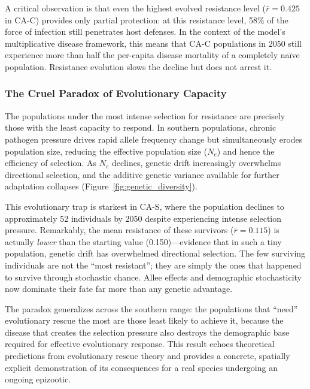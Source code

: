 \noindent
A critical observation is that even the highest evolved resistance
level ($\bar{r} = 0.425$ in CA-C) provides only partial protection:
at this resistance level, 58\% of the force of infection still
penetrates host defenses.  In the context of the model's multiplicative
disease framework, this means that CA-C populations in 2050 still
experience more than half the per-capita disease mortality of a
completely na\"ive population.  Resistance evolution slows the decline
but does not arrest it.

\subsubsection{The Cruel Paradox of Evolutionary Capacity}

The populations under the most intense selection for resistance are
precisely those with the least capacity to respond.  In southern
populations, chronic pathogen pressure drives rapid allele frequency
change but simultaneously erodes population size, reducing the
effective population size ($N_e$) and hence the efficiency of
selection.  As $N_e$ declines, genetic drift increasingly overwhelms
directional selection, and the additive genetic variance available for
further adaptation collapses
(Figure~\ref{fig:genetic_diversity}).

This evolutionary trap is starkest in CA-S, where the population
declines to approximately 52 individuals by 2050 despite experiencing
intense selection pressure.  Remarkably, the mean resistance of these
survivors ($\bar{r} = 0.115$) is actually \textit{lower} than the
starting value (0.150)---evidence that in such a tiny population,
genetic drift has overwhelmed directional selection.  The few surviving
individuals are not the ``most resistant''; they are simply the ones
that happened to survive through stochastic chance.  Allee effects
and demographic stochasticity now dominate their fate far more than
any genetic advantage.

The paradox generalizes across the southern range: the populations that
``need'' evolutionary rescue the most are those least likely to achieve
it, because the disease that creates the selection pressure also
destroys the demographic base required for effective evolutionary
response.  This result echoes theoretical predictions from
evolutionary rescue theory \citep{gomulkiewicz1995, bell2008} and
provides a concrete, spatially explicit demonstration of its
consequences for a real species undergoing an ongoing epizootic.

